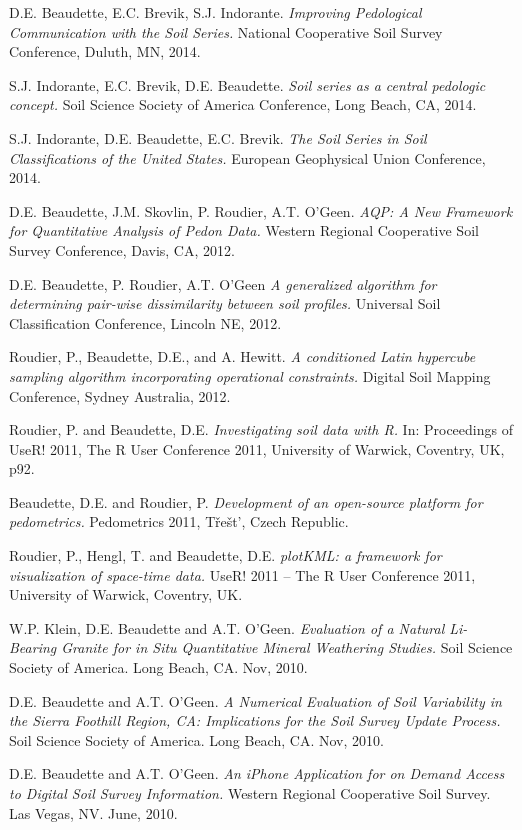 \documentclass[overlapped,line,10pt,letterpaper]{res}
\begin{document}
\begin{resume}
D.E. Beaudette, E.C. Brevik, S.J. Indorante. {\em Improving Pedological Communication with the Soil Series.} National Cooperative Soil Survey Conference, Duluth, MN, 2014.

S.J. Indorante, E.C. Brevik, D.E. Beaudette. {\em Soil series as a central pedologic concept.} Soil Science Society of America Conference, Long Beach, CA, 2014.

S.J. Indorante, D.E. Beaudette, E.C. Brevik. {\em The Soil Series in Soil Classifications of the United States.} European Geophysical Union Conference, 2014.

D.E. Beaudette, J.M. Skovlin, P. Roudier, A.T. O'Geen. {\em AQP: A New Framework for Quantitative Analysis of Pedon Data.} Western Regional Cooperative Soil Survey Conference, Davis, CA, 2012.

D.E. Beaudette, P. Roudier, A.T. O'Geen  {\em A generalized algorithm for determining pair-wise dissimilarity between soil profiles.} Universal Soil Classification Conference, Lincoln NE, 2012.

Roudier, P., Beaudette, D.E., and A. Hewitt. {\em A conditioned Latin hypercube sampling algorithm incorporating operational constraints.} Digital Soil Mapping Conference, Sydney Australia, 2012.

Roudier, P. and Beaudette, D.E. {\em Investigating soil data with R.} In:
Proceedings of UseR! 2011,  The R User Conference 2011, University of
Warwick, Coventry, UK, p92.

Beaudette, D.E. and Roudier, P. {\em Development of an open-source platform
for pedometrics.} Pedometrics 2011, T\v{r}e\v{s}t', Czech Republic.

Roudier, P., Hengl, T. and Beaudette, D.E. {\em plotKML: a framework for
visualization of space-time data.} UseR! 2011 -- The R User Conference
2011, University of Warwick, Coventry, UK.

W.P. Klein, D.E. Beaudette and A.T. O'Geen. {\em Evaluation of a Natural Li-Bearing Granite for in Situ Quantitative Mineral Weathering Studies.} Soil Science Society of America. Long Beach, CA. Nov, 2010.

D.E. Beaudette and A.T. O'Geen. {\em A Numerical Evaluation of Soil Variability in the Sierra Foothill Region, CA: Implications for the Soil Survey Update Process.} Soil Science Society of America. Long Beach, CA. Nov, 2010.

D.E. Beaudette and A.T. O'Geen. {\em An iPhone Application for on Demand Access to Digital Soil Survey Information.} Western Regional Cooperative Soil Survey. Las Vegas, NV. June, 2010.


\end{resume}
\end{document}
